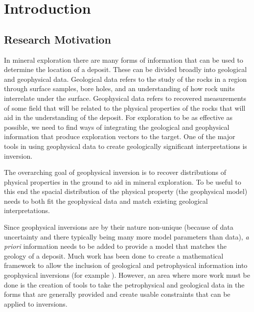 
\chapter{Introduction}
\label{ch:Introduction}

\begin{epigraph}
\end{epigraph}

\section{Research Motivation}
\label{sec:Research Motivation}

In mineral exploration there are many forms of information that can be used to determine the location of a deposit. These can be divided broadly into geological and geophysical data. Geological data refers to the study of the rocks in a region through surface samples, bore holes, and an understanding of how rock units interrelate under the surface. Geophysical data refers to recovered measurements of some field that will be related to the physical properties of the rocks that will aid in the understanding of the deposit. For exploration to be as effective as possible, we need to find ways of integrating the geological and geophysical information that produce exploration vectors to the target. One of the major tools in using geophysical data to create geologically significant interpretations is inversion.

The overarching goal of geophysical inversion is to recover distributions of physical properties in the ground to aid in mineral exploration. To be useful to this end the spacial distribution of the physical property (the geophysical model) needs to both fit the geophysical data and match existing geological interpretations. 

Since geophysical inversions are by their nature non-unique (because of data uncertainty and there typically being many more model parameters than data), \emph{a priori} information needs to be added to provide a model that matches the geology of a deposit. Much work has been done to create a mathematical framework to allow the inclusion of geological and petrophysical information into geophysical inversions (for example \cite{li19963}). However, an area where more work must be done is the creation of tools to take the petrophysical and geological data in the forms that are generally provided and create usable constraints that can be applied to inversions.

